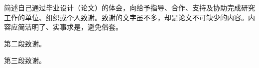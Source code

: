 
\clearpage
\chapter*{}

{\linespread{1.5} \selectfont 简述自己通过毕业设计（论文）的体会，向给予指导、合作、支持及协助完成研究工作的单位、组织或个人致谢。致谢的文字虽不多，却是论文不可缺少的内容。内容应简洁明了、实事求是，避免俗套。

第二段致谢。

第三段致谢。\par} %

